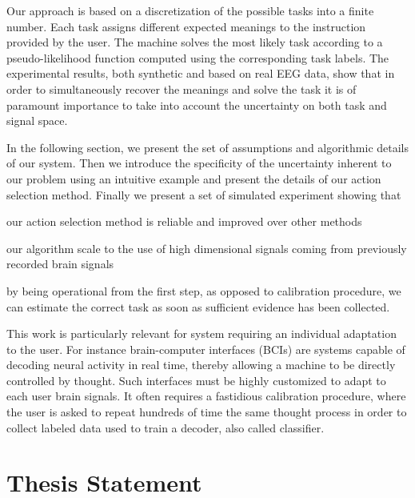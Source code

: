 Our approach is based on a discretization of the possible tasks into a finite number. Each task assigns different expected meanings to the instruction provided by the user. The machine solves the most likely task according to a pseudo-likelihood function computed using the corresponding task labels. The experimental results, both synthetic and based on real EEG data, show that in order to simultaneously recover the meanings and solve the task it is of paramount importance to take into account the uncertainty on both task and signal space.

In the following section, we present the set of assumptions and algorithmic details of our system. Then we introduce the specificity of the uncertainty inherent to our problem using an intuitive example and present the details of our action selection method. Finally we present a set of simulated experiment showing that 
\begin{inparaenum}[a)]
\item our action selection method is reliable and improved over other methods
\item our algorithm scale to the use of high dimensional signals coming from previously recorded brain signals
\item by being operational from the first step, as opposed to calibration procedure, we can estimate the correct task as soon as sufficient evidence has been collected.
\end{inparaenum}

This work is particularly relevant for system requiring an individual adaptation to the user. For instance brain-computer interfaces (BCIs) are systems capable of decoding neural activity in real time, thereby allowing a machine to be directly controlled by thought. Such interfaces must be highly customized to adapt to each user brain signals. It often requires a fastidious calibration procedure, where the user is asked to repeat hundreds of time the same thought process in order to collect labeled data used to train a decoder, also called classifier.

\section{Thesis Statement}

